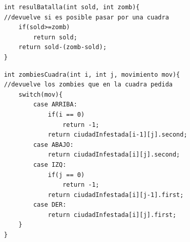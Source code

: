 	\begin{codesnippet}
	\begin{verbatim}
    int resulBatalla(int sold, int zomb){
    //devuelve si es posible pasar por una cuadra
        if(sold>=zomb)
            return sold;
        return sold-(zomb-sold); 
    }
	\end{verbatim}
	\end{codesnippet}

	\begin{codesnippet}
	\begin{verbatim}
    int zombiesCuadra(int i, int j, movimiento mov){
    //devuelve los zombies que en la cuadra pedida
        switch(mov){
            case ARRIBA:
                if(i == 0)
                    return -1;
                return ciudadInfestada[i-1][j].second;
            case ABAJO:
                return ciudadInfestada[i][j].second;
            case IZQ:
                if(j == 0)
                    return -1;
                return ciudadInfestada[i][j-1].first;
            case DER:
                return ciudadInfestada[i][j].first;
        }
    }
	\end{verbatim}
	\end{codesnippet}

